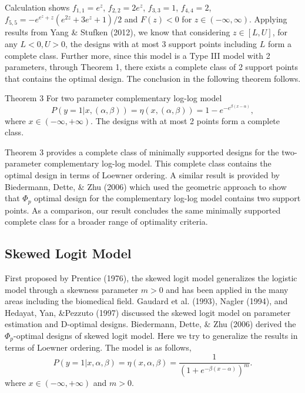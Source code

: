 \documentclass[12pt]{TD-CJS}
\begin{document}
Calculation shows $f_{1,1} = e^z$, $f_{2,2} =2e^z$, $f_{3,3} = 1$, $f_{4,4} = 2$, $f_{5,5} =- e^{e^z+z}(e^{2z}+3e^z+1)/2$ and $F(z)<0$ for $z\in(-\infty,\infty)$. Applying results from Yang \& Stufken (2012), we know that considering $z\in[L,U]$, for any $L<0, U>0$, the designs with at most 3 support points including $L$ form a complete class. Further more, since this model is a Type III model with 2 parameters, through Theorem 1, there exists a complete class of 2 support points that contains the optimal design. The conclusion in the following theorem follows.




\begin{theorem}{Theorem 3}{}\label{comp}
For two parameter complementary log-log model\[
P(y=1|x,(\alpha,\beta)) = \eta(x,(\alpha,\beta))= 1-e^{-e^{\beta(x-\alpha)}},
\] where $x\in (-\infty,+\infty)$. The designs with at most 2 points form a complete class.
\end{theorem}


Theorem 3 provides a complete class of minimally supported designs for the two-parameter complementary log-log model. This complete class contains the optimal design in terms of Loewner ordering. A similar result is provided by Biedermann, Dette, \& Zhu (2006) which used the geometric approach to show that $\Phi_p$ optimal design for the complementary log-log model contains two support points. As a comparison, our result concludes the same minimally supported complete class for a broader range of optimality criteria.

\subsection{Skewed Logit Model}\label{secskew}
First proposed by Prentice (1976), the skewed logit model generalizes the logistic model through a skewness parameter $m>0$ and has been applied in the many areas including the biomedical field.  Gaudard et al. (1993), Nagler (1994), and Hedayat, Yan, \&Pezzuto (1997) discussed the skewed logit model on parameter estimation and D-optimal designs. Biedermann, Dette, \& Zhu (2006) derived the $\Phi_p$-optimal designs of skewed logit model. Here we try to generalize the results in terms of Loewner ordering. The model is as follows,\[
P(y=1|x,\alpha,\beta) = \eta(x,\alpha,\beta)= \frac{1}{(1+e^{-\beta(x-\alpha)})^m}.
\]where $x\in (-\infty,+\infty)$ and $m>0$. 
\end{document}
